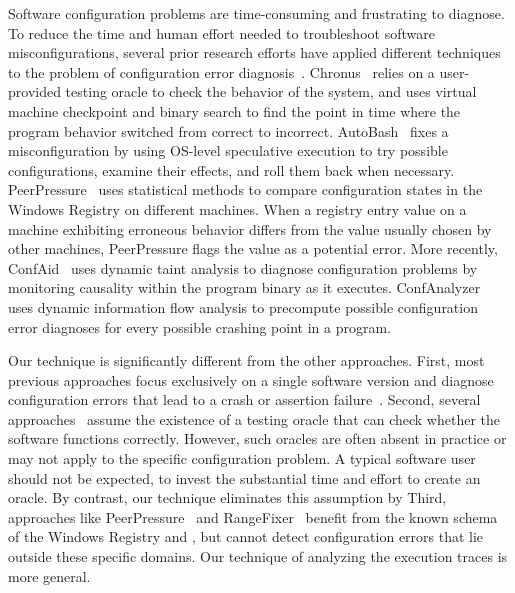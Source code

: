 Software configuration problems are time-consuming
and frustrating to diagnose. To reduce the time and human
effort needed to troubleshoot software misconfigurations,
several prior research efforts have applied different techniques
to the problem of configuration error diagnosis~\cite{Attariyan:2008:UCD, 
Whitaker:2004:CDS, Wang:2004:AMT, rangefix,
Attariyan:2010:ACT, Rabkin:2011:PPC, keller:conferr}.
Chronus~\cite{Whitaker:2004:CDS} relies on a user-provided
testing oracle to check the behavior of the system, and uses
virtual machine checkpoint and binary search to find the
point in time where the program behavior
switched from correct to incorrect. AutoBash~\cite{Su:2007:AIC}
fixes a misconfiguration by using
OS-level speculative execution to try possible
configurations, examine their effects, and roll them back when necessary.
PeerPressure~\cite{Wang:2004:AMT} 
uses statistical methods to compare
configuration states in the Windows Registry on different machines.
When a registry entry value on a machine exhibiting erroneous behavior differs
from the value usually chosen by other machines, PeerPressure
flags the value as a potential error. More recently, ConfAid~\cite{Attariyan:2010:ACT}
uses dynamic taint analysis to diagnose configuration problems 
by monitoring causality within the program binary as it executes.
ConfAnalyzer~\cite{Rabkin:2011:PPC} uses dynamic information flow analysis to precompute
possible configuration error diagnoses for every possible crashing point
in a program. 

Our technique is significantly different from the other approaches.
First, most previous approaches focus exclusively on a single software
version and diagnose configuration errors that lead to a crash or
assertion failure~\cite{Attariyan:2008:UCD, Whitaker:2004:CDS, 
Attariyan:2010:ACT, Rabkin:2011:PPC}.
Second, several approaches~\cite{Attariyan:2010:ACT, Whitaker:2004:CDS}
assume the existence of a testing oracle that can 
check whether the software functions correctly. However,
such oracles are often
absent in practice or may not apply to the specific configuration problem.
A typical software user should not be expected, to invest the substantial
time and effort to create an oracle.
By contrast, our technique eliminates this assumption by
 Third, approaches like
PeerPressure~\cite{Wang:2004:AMT} and RangeFixer~\cite{} benefit from
the known schema of the Windows Registry and
, but cannot detect configuration errors
that lie outside these specific domains. Our technique
of analyzing the execution traces is more general.

